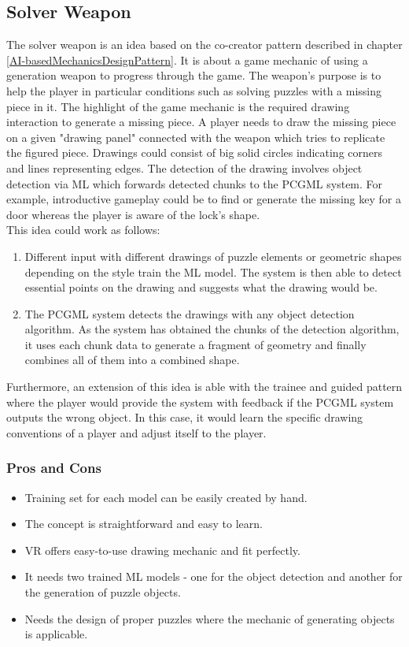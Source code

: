 \documentclass[MGS,Master,english]{twbook}%
\begin{document}
\subsection{Solver Weapon} \label{idea::solverWeapon}
The solver weapon is an idea based on the co-creator pattern described in chapter \ref{AI-basedMechanicsDesignPattern}. It is about a game mechanic of using a generation weapon to progress through the game. The weapon's purpose is to help the player in particular conditions such as solving puzzles with a missing piece in it. The highlight of the game mechanic is the required drawing interaction to generate a missing piece. A player needs to draw the missing piece on a given "drawing panel" connected with the weapon which tries to replicate the figured piece. Drawings could consist of big solid circles indicating corners and lines representing edges. The detection of the drawing involves object detection via ML which forwards detected chunks to the PCGML system. For example, introductive gameplay could be to find or generate the missing key for a door whereas the player is aware of the lock's shape.\\
This idea could work as follows: 
\begin{enumerate}
	\item Different input with different drawings of puzzle elements or geometric shapes depending on the style train the ML model. The system is then able to detect essential points on the drawing and suggests what the drawing would be.
	\item The PCGML system detects the drawings with any object detection algorithm. As the system has obtained the chunks of the detection algorithm, it uses each chunk data to generate a fragment of geometry and finally combines all of them into a combined shape.
\end{enumerate}
Furthermore, an extension of this idea is able with the trainee and guided pattern where the player would provide the system with feedback if the PCGML system outputs the wrong object. In this case, it would learn the specific drawing conventions of a player and adjust itself to the player.

\subsubsection{Pros and Cons}
\begin{itemize}
	\item Training set for each model can be easily created by hand.
	\item The concept is straightforward and easy to learn.
	\item \ac{VR} offers easy-to-use drawing mechanic and fit perfectly.
	\item It needs two trained ML models - one for the object detection and another for the generation of puzzle objects. 
	\item Needs the design of proper puzzles where the mechanic of generating objects is applicable.
\end{itemize}
\end{document}
